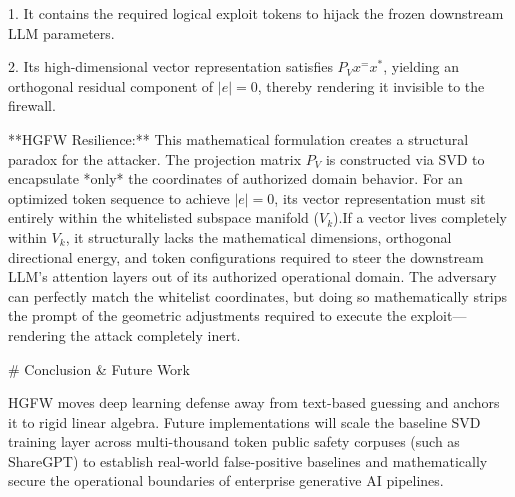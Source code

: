 1.  It contains the required logical exploit tokens to hijack the frozen
    downstream LLM parameters.

2.  Its high-dimensional vector representation satisfies $P_V x^ = x^*$,
    yielding an orthogonal residual component of $|e| = 0$, thereby
    rendering it invisible to the firewall.

**HGFW Resilience:** This mathematical formulation creates a structural
paradox for the attacker. The projection matrix $P_V$ is constructed via
SVD to encapsulate *only* the coordinates of authorized domain behavior.
For an optimized token sequence to achieve $|e| = 0$, its vector
representation must sit entirely within the whitelisted subspace
manifold ($V_k$).If a vector lives completely within $V_k$, it
structurally lacks the mathematical dimensions, orthogonal directional
energy, and token configurations required to steer the downstream LLM's
attention layers out of its authorized operational domain. The adversary
can perfectly match the whitelist coordinates, but doing so
mathematically strips the prompt of the geometric adjustments required
to execute the exploit---rendering the attack completely inert.

# Conclusion & Future Work

HGFW moves deep learning defense away from text-based guessing and
anchors it to rigid linear algebra. Future implementations will scale
the baseline SVD training layer across multi-thousand token public
safety corpuses (such as ShareGPT) to establish real-world
false-positive baselines and mathematically secure the operational
boundaries of enterprise generative AI pipelines.

